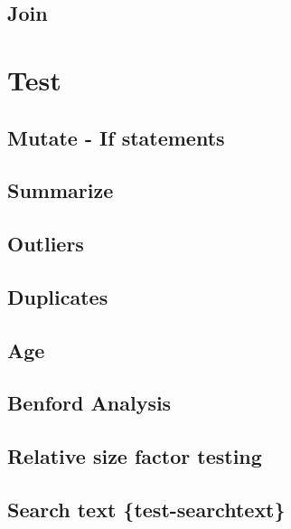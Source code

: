 \documentclass[
]{book}
\begin{document}
\hypertarget{join}{%
\section{Join}\label{join}}

\hypertarget{test}{%
\chapter{Test}\label{test}}

\hypertarget{mutate---if-statements}{%
\section{Mutate - If statements}\label{mutate---if-statements}}

\hypertarget{summarize}{%
\section{Summarize}\label{summarize}}

\hypertarget{outliers}{%
\section{Outliers}\label{outliers}}

\hypertarget{duplicates}{%
\section{Duplicates}\label{duplicates}}

\hypertarget{age}{%
\section{Age}\label{age}}

\hypertarget{benford-analysis}{%
\section{Benford Analysis}\label{benford-analysis}}

\hypertarget{relative-size-factor-testing}{%
\section{Relative size factor testing}\label{relative-size-factor-testing}}

\hypertarget{search-text-test-searchtext}{%
\section{Search text \{test-searchtext\}}\label{search-text-test-searchtext}}
\end{document}
